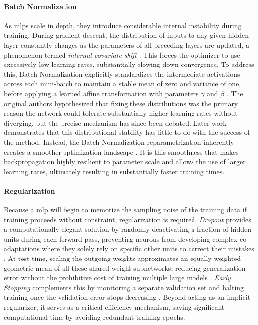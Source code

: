 \paragraph{Batch Normalization}
As \glspl{mlp} scale in depth, they introduce considerable internal instability during training. During gradient descent, the distribution of inputs to any given hidden layer constantly changes as the parameters of all preceding layers are updated, a phenomenon termed \textit{internal covariate shift} \parencite{ioffeBatchNormalizationAccelerating2015a}. This forces the optimizer to use excessively low learning rates, substantially slowing down convergence. To address this, Batch Normalization explicitly standardizes the intermediate activations across each mini-batch to maintain a stable mean of zero and variance of one, before applying a learned affine transformation with parameters $\gamma$ and $\beta$ \parencite{ioffeBatchNormalizationAccelerating2015a}. The original authors hypothesized that fixing these distributions was the primary reason the network could tolerate substantially higher learning rates without diverging, but the precise mechanism has since been debated. Later work demonstrates that this distributional stability has little to do with the success of the method. Instead, the Batch Normalization reparametrization inherently creates a smoother optimization landscape \parencite{santurkarHowDoesBatch2019}. It is this smoothness that makes backpropagation highly resilient to parameter scale and allows the use of larger learning rates, ultimately resulting in substantially faster training times.

\paragraph{Regularization}
Because a \gls{mlp} will begin to memorize the sampling noise of the training data if training proceeds without constraint, regularization is required. \textit{Dropout} provides a computationally elegant solution by randomly deactivating a fraction of hidden units during each forward pass, preventing neurons from developing complex co-adaptations where they solely rely on specific other units to correct their mistakes \parencite{srivastavaDropoutSimpleWay2014}. At test time, scaling the outgoing weights approximates an equally weighted geometric mean of all these shared-weight subnetworks, reducing generalization error without the prohibitive cost of training multiple large models \parencite{srivastavaDropoutSimpleWay2014}. \textit{Early Stopping} complements this by monitoring a separate validation set and halting training once the validation error stops decreasing \parencite{precheltEarlyStoppingWhen2012}. Beyond acting as an implicit regularizer, it serves as a critical efficiency mechanism, saving significant computational time by avoiding redundant training epochs.

